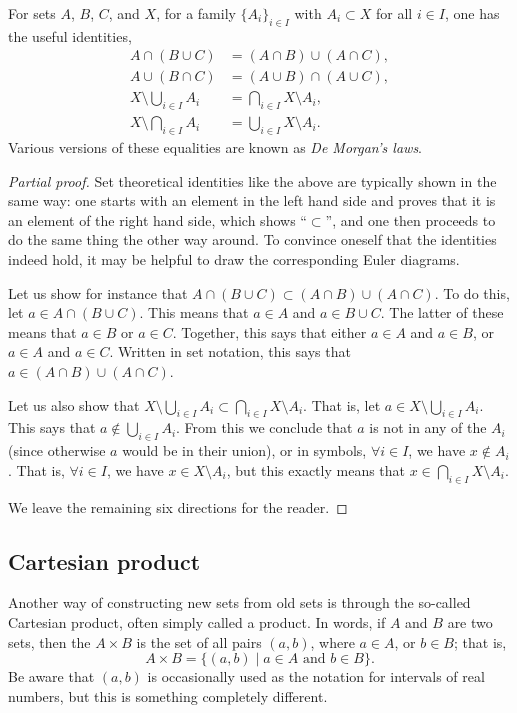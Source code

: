 \begin{prop}
  \label{de-morgan}
  For sets $A$, $B$, $C$, and $X$, for a family $\{ A_i \}_{i \in I}$ with $A_i \subset X$ for all $i \in I$, one has the useful identities,
  \begin{align*}
    A \cap (B \cup C) &= (A \cap B) \cup (A \cap C), \\
    A \cup (B \cap C) &= (A \cup B) \cap (A \cup C), \\
    X \setminus \bigcup_{i \in I} A_i &= \bigcap_{i \in I} X \setminus A_i, \\
    X \setminus \bigcap_{i \in I} A_i &= \bigcup_{i \in I} X \setminus A_i.
  \end{align*}
  Various versions of these equalities are known as \emph{De Morgan's laws}.
\end{prop}
\begin{proof}[Partial proof]
  Set theoretical identities like the above are typically shown in the same way: one starts with an element in the left hand side and proves that it is an element of the right hand side, which shows ``$\subset$'', and one then proceeds to do the same thing the other way around. To convince oneself that the identities indeed hold, it may be helpful to draw the corresponding Euler diagrams.
  
  Let us show for instance that $A \cap (B \cup C) \subset (A \cap B) \cup (A \cap C)$. To do this, let $a \in A \cap (B \cup C)$. This means that $a \in A$ and $a \in B \cup C$. The latter of these means that $a \in B$ or $a \in C$. Together, this says that either $a \in A$ and $a \in B$, or $a \in A$ and $a \in C$. Written in set notation, this says that $a \in (A \cap B) \cup (A \cap C)$.
  
  Let us also show that $X \setminus \bigcup_{i \in I} A_i \subset \bigcap_{i \in I} X \setminus A_i$. That is, let $a \in X \setminus \bigcup_{i \in I} A_i$. This says that $a \notin \bigcup_{i \in I} A_i$. From this we conclude that $a$ is not in any of the $A_i$ (since otherwise $a$ would be in their union), or in symbols, $\forall i \in I$, we have $x \notin A_i$. That is, $\forall i \in I$, we have $x \in X \setminus A_i$, but this exactly means that $x \in \bigcap_{i \in I} X \setminus A_i$.
  
  We leave the remaining six directions for the reader.
\end{proof}

\subsection{Cartesian product}
\label{cartesian-product}
Another way of constructing new sets from old sets is through the so-called Cartesian product, often simply called a product. In words, if $A$ and $B$ are two sets, then the  $A \times B$ is the set of all pairs $(a,b)$, where $a \in A$, or $b \in B$; that is,
\[
  A \times B = \{ (a,b) \mid \text{$a \in A$ and $b \in B$}\}.
\]
Be aware that $(a,b)$ is occasionally used as the notation for intervals of real numbers, but this is something completely different.

